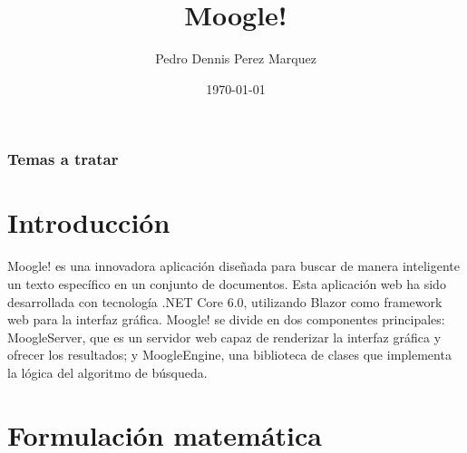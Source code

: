 \documentclass{beamer}
\title[Perez Marquez]{Moogle!}
\author[Pedro Dennis]{Pedro Dennis Perez Marquez}
\date{\today}
\begin{document}

\begin{frame}
	\frametitle{Temas a tratar} 
	\tableofcontents 
\end{frame}

\section{Introducci\'on}
\begin{frame}
\begin{minipage}{10cm}
	 Moogle! es una innovadora aplicación diseñada para buscar de manera inteligente un texto específico en un conjunto de documentos. Esta aplicación web ha sido desarrollada con tecnología .NET Core 6.0, utilizando Blazor como framework web para la interfaz gráfica. Moogle! se divide en dos componentes principales: MoogleServer, que es un servidor web capaz de renderizar la interfaz gráfica y ofrecer los resultados; y MoogleEngine, una biblioteca de clases que implementa la lógica del algoritmo de búsqueda. 
\end{minipage}
\end{frame}

\section{Formulaci\'on matem\'atica}
\end{document}
